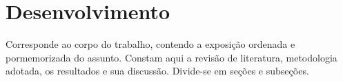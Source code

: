 \chapter{Desenvolvimento}

Corresponde ao corpo do trabalho, contendo a exposição ordenada e pormemorizada
do assunto. Constam aqui a revisão de literatura, metodologia adotada, os resultados e
sua discussão. Divide-se em seções e subseções. \cite{Robert2007}
